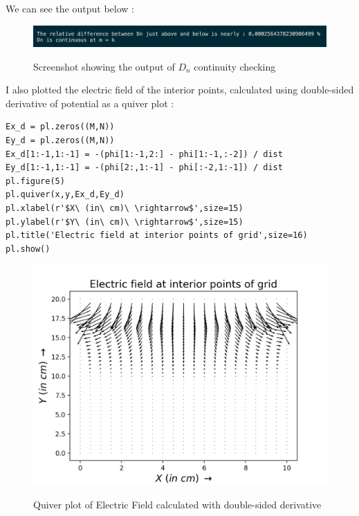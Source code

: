 \documentclass[11pt, a4paper]{article}
\begin{document}
We can see the output below :
\begin{figure}[H]
  \centering
  \includegraphics[scale=0.5]{cont_out.png}
  \label{fig:cont_out}
  \caption{Screenshot showing the output of $D_n$ continuity checking}
\end{figure}
I also plotted the electric field of the interior points, calculated using double-sided derivative of potential as a quiver plot :
\begin{verbatim}
Ex_d = pl.zeros((M,N))
Ey_d = pl.zeros((M,N))
Ex_d[1:-1,1:-1] = -(phi[1:-1,2:] - phi[1:-1,:-2]) / dist
Ey_d[1:-1,1:-1] = -(phi[2:,1:-1] - phi[:-2,1:-1]) / dist
pl.figure(5)
pl.quiver(x,y,Ex_d,Ey_d)
pl.xlabel(r'$X\ (in\ cm)\ \rightarrow$',size=15)
pl.ylabel(r'$Y\ (in\ cm)\ \rightarrow$',size=15)
pl.title('Electric field at interior points of grid',size=16)
pl.show()
\end{verbatim}
\begin{figure}[H]
  \centering
  \includegraphics[scale=0.6]{EF_double.png}
  \label{fig:EF_double}
  \caption{Quiver plot of Electric Field calculated with double-sided derivative}
\end{figure}
\end{document}
